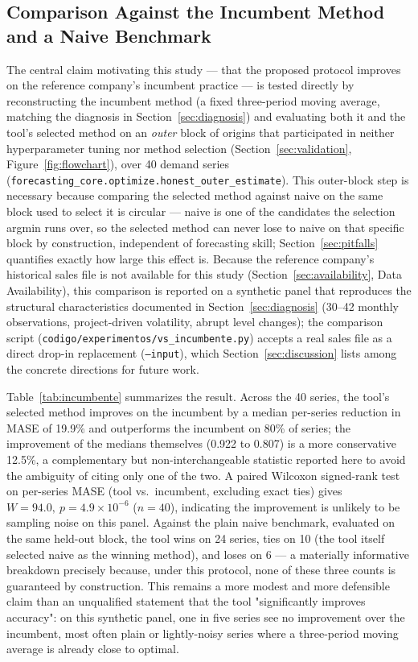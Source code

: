 \documentclass[forecasting,article,submit,pdftex,moreauthors]{Definitions/mdpi}
\begin{document}
\subsection{Comparison Against the Incumbent Method and a Naive Benchmark}
\label{sec:incumbente}

The central claim motivating this study --- that the proposed protocol improves on the reference company's incumbent practice --- is tested directly by reconstructing the incumbent method (a fixed three-period moving average, matching the diagnosis in Section~\ref{sec:diagnosis}) and evaluating both it and the tool's selected method on an \emph{outer} block of origins that participated in neither hyperparameter tuning nor method selection (Section~\ref{sec:validation}, Figure~\ref{fig:flowchart}), over 40 demand series (\texttt{forecasting\_\allowbreak core.optimize.honest\_\allowbreak outer\_\allowbreak estimate}). This outer-block step is necessary because comparing the selected method against naive on the same block used to select it is circular --- naive is one of the candidates the selection argmin runs over, so the selected method can never lose to naive on that specific block by construction, independent of forecasting skill; Section~\ref{sec:pitfalls} quantifies exactly how large this effect is. Because the reference company's historical sales file is not available for this study (Section~\ref{sec:availability}, Data Availability), this comparison is reported on a synthetic panel that reproduces the structural characteristics documented in Section~\ref{sec:diagnosis} (30--42 monthly observations, project-driven volatility, abrupt level changes); the comparison script (\texttt{codigo/\allowbreak experimentos/\allowbreak vs\_\allowbreak incumbente.py}) accepts a real sales file as a direct drop-in replacement (\texttt{--input}), which Section~\ref{sec:discussion} lists among the concrete directions for future work.

Table~\ref{tab:incumbente} summarizes the result. Across the 40 series, the tool's selected method improves on the incumbent by a median per-series reduction in MASE of 19.9\% and outperforms the incumbent on 80\% of series; the improvement of the medians themselves (0.922 to 0.807) is a more conservative 12.5\%, a complementary but non-interchangeable statistic reported here to avoid the ambiguity of citing only one of the two. A paired Wilcoxon signed-rank test on per-series MASE (tool vs.\ incumbent, excluding exact ties) gives $W=94.0,\ p=4.9\times10^{-6}$ ($n=40$), indicating the improvement is unlikely to be sampling noise on this panel. Against the plain naive benchmark, evaluated on the same held-out block, the tool wins on 24 series, ties on 10 (the tool itself selected naive as the winning method), and loses on 6 --- a materially informative breakdown precisely because, under this protocol, none of these three counts is guaranteed by construction. This remains a more modest and more defensible claim than an unqualified statement that the tool "significantly improves accuracy": on this synthetic panel, one in five series see no improvement over the incumbent, most often plain or lightly-noisy series where a three-period moving average is already close to optimal.
\end{document}
